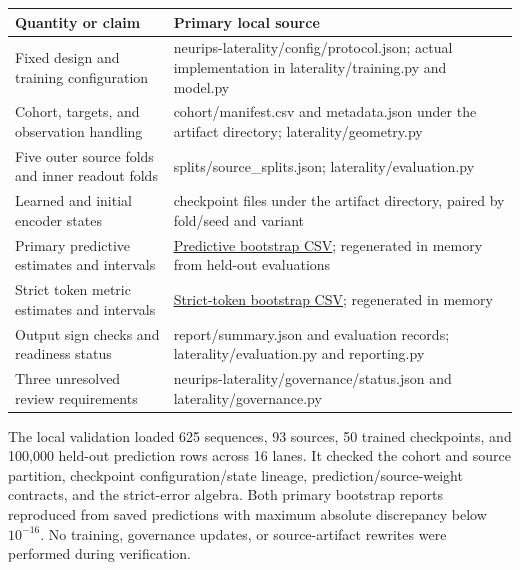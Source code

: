 \documentclass[11pt,letterpaper]{article}
\newcounter{none}
\begin{document}
\begin{minipage}{\linewidth}

{\def\LTcaptype{none} %
\begin{longtable}[]{@{}
  >{\raggedright\arraybackslash}p{}
  >{\raggedright\arraybackslash}p{}@{}}
\toprule\noalign{}
\begin{minipage}[b]{\linewidth}\raggedright
Quantity or claim
\end{minipage} & \begin{minipage}[b]{\linewidth}\raggedright
Primary local source
\end{minipage} \\
\midrule\noalign{}
\endhead
\bottomrule\noalign{}
\endlastfoot
Fixed design and training configuration &
neurips-laterality/config/protocol.json; actual implementation in
laterality/training.py and model.py \\
Cohort, targets, and observation handling & cohort/manifest.csv and
metadata.json under the artifact directory; laterality/geometry.py \\
Five outer source folds and inner readout folds &
splits/source\_splits.json; laterality/evaluation.py \\
Learned and initial encoder states & 50 checkpoint files under the
artifact directory, paired by fold/seed and variant \\
Primary predictive estimates and intervals &
\href{../../neurips-laterality/artifacts/paper/protocol_6f7baefbda07/report/checkpoint_source_bootstrap.csv}{Predictive
bootstrap CSV}; regenerated in memory from held-out evaluations \\
Strict token metric estimates and intervals &
\href{../../neurips-laterality/artifacts/paper/protocol_6f7baefbda07/report/strict_representation_equivariance_source_bootstrap.csv}{Strict-token
bootstrap CSV}; regenerated in memory \\
Output sign checks and readiness status & report/summary.json and
evaluation records; laterality/evaluation.py and reporting.py \\
Three unresolved review requirements &
neurips-laterality/governance/status.json and
laterality/governance.py \\
\end{longtable}
}

\end{minipage}

The local validation loaded 625 sequences, 93 sources, 50 trained
checkpoints, and 100,000 held-out prediction rows across 16 lanes. It
checked the cohort and source partition, checkpoint configuration/state
lineage, prediction/source-weight contracts, and the strict-error
algebra. Both primary bootstrap reports reproduced from saved
predictions with maximum absolute discrepancy below \(10^{-16}\). No
training, governance updates, or source-artifact rewrites were performed
during verification.
\end{document}
